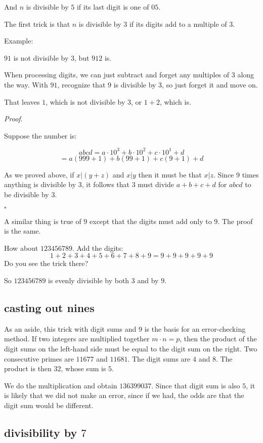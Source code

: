 \documentclass[11pt, oneside]{article}
\begin{document}
And $n$ is divisible by $5$ if its last digit is one of $05$.

The first trick is that $n$ is divisible by $3$ if its digits add to a multiple of $3$.

Example:

$91$ is not divisible by $3$, but $912$ is.  

When processing digits, we can just subtract and forget any multiples of $3$ along the way.  With $91$, recognize that $9$ is divisible by $3$, so just forget it and move on.  

That leaves $1$, which is not divisible by $3$, or $1 + 2$, which is.

\emph{Proof}.

Suppose the number is:

\[ abcd = a \cdot 10^3 + b \cdot 10^2 + c \cdot 10^1 + d \]
\[ = a (999 + 1) + b (99 + 1) + c (9 + 1) + d \]

As we proved above, if $x|(y+z)$ and $x|y$ then it must be that $x|z$.  Since $9$ times anything is divisible by $3$, it follows that $3$ must divide $a + b + c + d$ for $abcd$ to be divisible by $3$.

$\square$

A similar thing is true of $9$ except that the digits must add only to $9$.  The proof is the same.

How about $123456789$.  Add the digits:
\[ 1 + 2 + 3 + 4 + 5 + 6 + 7 + 8 + 9 = 9 + 9 + 9 + 9 + 9 \]
Do you see the trick there?

So $123456789$ is evenly divisible by both $3$ and by $9$.

\subsection*{casting out nines}

As an aside, this trick with digit sums and $9$ is the basis for an error-checking method.  If two integers are multiplied together $m \cdot n = p$, then the product of the digit sums on the left-hand side must be equal to the digit sum on the right.  Two consecutive primes are $11677$ and $11681$.  The digit sums are $4$ and $8$.  The product is then $32$, whose sum is $5$.  

We do the multiplication and obtain $136399037$.  Since that digit sum is also $5$, it is likely that we did not make an error, since if we had, the odds are that the digit sum would be different.

\subsection*{divisibility by $7$}
\end{document}
